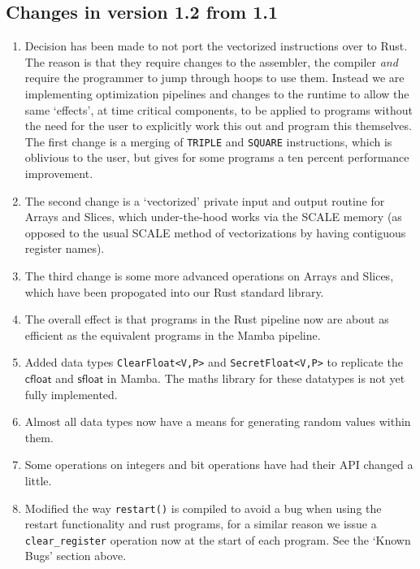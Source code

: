 \subsection{Changes in version 1.2 from 1.1}
\begin{enumerate}
\item Decision has been made to not port the vectorized instructions over
	to Rust. The reason is that they require changes to the assembler,
	the compiler {\em and} require the programmer to jump through hoops
	to use them. Instead we are implementing optimization pipelines
	and changes to the runtime to allow the same `effects', at
	time critical components, to be applied to programs without the 
	need for the user to explicitly work this out and program this
	themselves.
	The first change is a merging of \verb|TRIPLE| and \verb|SQUARE|
	instructions, which is oblivious to the user, but gives for
	some programs a ten percent performance improvement.
\item  The second change is a `vectorized' private input and output
	routine for Arrays and Slices, which under-the-hood works
	via the SCALE memory (as opposed  to the usual SCALE method
	of vectorizations by having contiguous register names).
\item The third change is some more advanced operations on Arrays and Slices,
	which have been propogated into our Rust standard library.
\item The overall effect is that programs in the Rust pipeline
	now are about as efficient as the equivalent programs in the
       Mamba pipeline.
\item Added data types \verb|ClearFloat<V,P>| and \verb|SecretFloat<V,P>|
	to replicate the $\mathsf{cfloat}$ and $\mathsf{sfloat}$ in Mamba.
	The maths library for these datatypes is not yet fully implemented.
\item Almost all data types now have a means for generating random values
	within them.
\item Some operations on integers and bit operations have had their
	API changed a little.
\item Modified the way \verb|restart()| is compiled to avoid a bug when using the
	restart functionality and rust programs, for a similar reason we issue a
      \verb|clear_register| operation now at the start of each program.
	See the `Known Bugs' section above. 
\end{enumerate}

